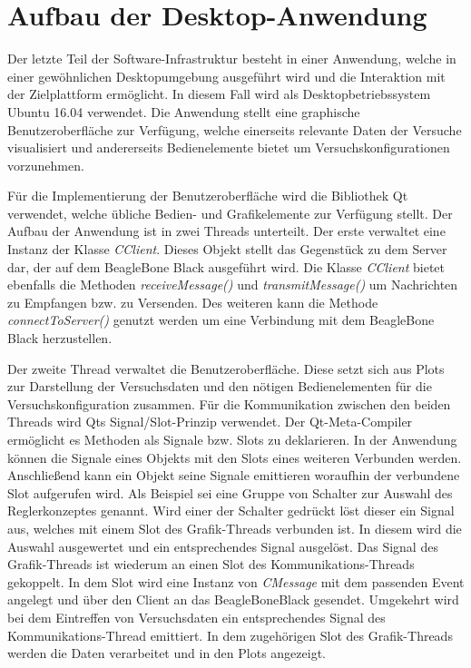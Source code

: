\section{Aufbau der Desktop-Anwendung}
Der letzte Teil der Software-Infrastruktur besteht in einer Anwendung, welche in einer gewöhnlichen Desktopumgebung ausgeführt wird und die Interaktion mit der Zielplattform ermöglicht. In diesem Fall wird als Desktopbetriebssystem Ubuntu 16.04 verwendet. Die Anwendung stellt eine graphische Benutzeroberfläche zur Verfügung, welche einerseits relevante Daten der Versuche visualisiert und andererseits Bedienelemente bietet um Versuchskonfigurationen vorzunehmen.

Für die Implementierung der Benutzeroberfläche wird die Bibliothek Qt verwendet, welche übliche Bedien- und Grafikelemente zur Verfügung stellt. Der Aufbau der Anwendung ist in zwei Threads unterteilt. Der erste verwaltet eine Instanz der Klasse \textit{CClient}. Dieses Objekt stellt das Gegenstück zu dem Server dar, der auf dem BeagleBone Black ausgeführt wird. Die Klasse \textit{CClient} bietet ebenfalls die Methoden \textit{receiveMessage()} und \textit{transmitMessage()} um Nachrichten zu Empfangen bzw. zu Versenden. Des weiteren kann die Methode \textit{connectToServer()} genutzt werden um eine Verbindung mit dem BeagleBone Black herzustellen.

Der zweite Thread verwaltet die Benutzeroberfläche. Diese setzt sich aus Plots zur Darstellung der Versuchsdaten und den nötigen Bedienelementen für die Versuchskonfiguration zusammen. Für die Kommunikation zwischen den beiden Threads wird Qts Signal/Slot-Prinzip verwendet. Der Qt-Meta-Compiler ermöglicht es Methoden als Signale bzw. Slots zu deklarieren. In der Anwendung können die Signale eines Objekts mit den Slots eines weiteren Verbunden werden. Anschließend kann ein Objekt seine Signale emittieren woraufhin der verbundene Slot aufgerufen wird. Als Beispiel sei eine Gruppe von Schalter zur Auswahl des Reglerkonzeptes genannt. Wird einer der Schalter gedrückt löst dieser ein Signal aus, welches mit einem Slot des Grafik-Threads verbunden ist. In diesem wird die Auswahl ausgewertet und ein entsprechendes Signal ausgelöst. Das Signal des Grafik-Threads ist wiederum an einen Slot des Kommunikations-Threads gekoppelt. In dem Slot wird eine Instanz von \textit{CMessage} mit dem passenden Event angelegt und über den Client an das BeagleBoneBlack gesendet. Umgekehrt wird bei dem Eintreffen von Versuchsdaten ein entsprechendes Signal des Kommunikations-Thread emittiert. In dem zugehörigen Slot des Grafik-Threads werden die Daten verarbeitet und in den Plots angezeigt.